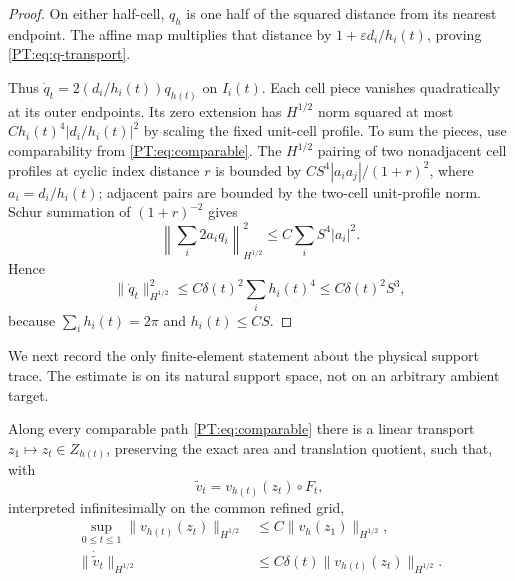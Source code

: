 \begin{proof}
On either half-cell, $q_h$ is one half of the squared distance from its
nearest endpoint.  The affine map multiplies that distance by
$1+\varepsilon d_i/h_i(t)$, proving \eqref{PT:eq:q-transport}.

Thus $\dot q_t=2(d_i/h_i(t))q_{h(t)}$ on $I_i(t)$.  Each cell piece
vanishes quadratically at its outer endpoints.  Its zero extension has
$H^{1/2}$ norm squared at most $Ch_i(t)^4|d_i/h_i(t)|^2$ by scaling the
fixed unit-cell profile.  To sum the pieces, use comparability from
\eqref{PT:eq:comparable}.  The $H^{1/2}$ pairing of two nonadjacent cell
profiles at cyclic index distance $r$ is bounded by
$CS^4|a_i a_j|/(1+r)^2$, where $a_i=d_i/h_i(t)$; adjacent pairs are
bounded by the two-cell unit-profile norm.  Schur summation of
$(1+r)^{-2}$ gives
\[
 \left\|\sum_i2a_iq_i\right\|_{H^{1/2}}^2
 \le C\sum_i S^4|a_i|^2.
\]
Hence
\[
 \|\dot q_t\|_{H^{1/2}}^2
 \le C\delta(t)^2\sum_i h_i(t)^4
 \le C\delta(t)^2S^3,
\]
because $\sum_i h_i(t)=2\pi$ and $h_i(t)\le CS$.
\end{proof}

We next record the only finite-element statement about the physical
support trace.  The estimate is on its natural support space, not on an
arbitrary ambient target.

\begin{lemma}\label{PT:lem:v-transport}
Along every comparable path \eqref{PT:eq:comparable} there is a linear
transport $z_1\mapsto z_t\in Z_{h(t)}$, preserving the exact area and
translation quotient, such that, with
\begin{equation}\label{PT:eq:vtilde}
 \widetilde v_t=v_{h(t)}(z_t)\circ F_t,
\end{equation}
interpreted infinitesimally on the common refined grid,
\begin{align}
 \sup_{0\le t\le1}\|v_{h(t)}(z_t)\|_{H^{1/2}}
 &\le C\|v_h(z_1)\|_{H^{1/2}},\label{PT:eq:v-uniform}\\
 \|\dot{\widetilde v}_t\|_{H^{1/2}}
 &\le C\delta(t)\|v_{h(t)}(z_t)\|_{H^{1/2}}.
 \label{PT:eq:vdot}
\end{align}
\end{lemma}

